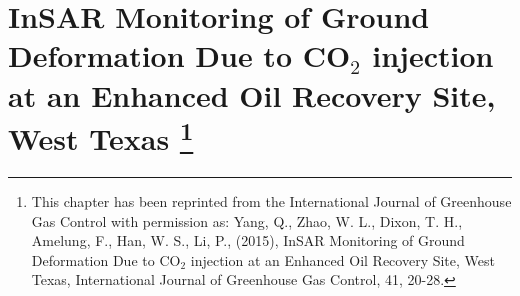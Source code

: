 % 
% 
% 
% 
% 
% 
% 
% 
% 
% 
% 
% 
% 

% 

\chapter[InSAR Monitoring of Ground Deformation Due to CO$_{2}$ injection at an Enhanced Oil Recovery Site, West Texas]{InSAR Monitoring of Ground Deformation Due to CO$_{2}$ injection at an Enhanced Oil Recovery Site, West Texas \footnote{This chapter has been reprinted from the International Journal of Greenhouse Gas Control with permission as: Yang, Q., Zhao, W. L., Dixon, T. H., Amelung, F., Han, W. S., Li, P., (2015), InSAR Monitoring of Ground Deformation Due to CO$_{2}$ injection at an Enhanced Oil Recovery Site, West Texas, International Journal of Greenhouse Gas Control, 41, 20-28.}}

